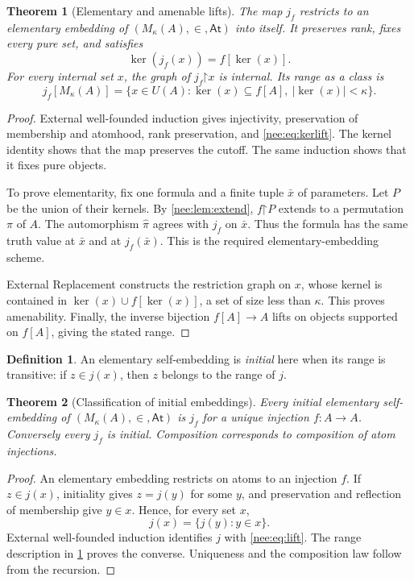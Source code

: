 \documentclass[11pt,letterpaper]{article}
\numberwithin{equation}{section}
\theoremstyle{plain}
\newtheorem{theorem}{Theorem}[section]
\theoremstyle{definition}
\newtheorem{definition}[definition]{Definition}
\theoremstyle{remark}
\newcommand{\At}{\mathsf{At}}
\newcommand{\kerat}{\operatorname{ker}}
\begin{document}
\begin{theorem}[Elementary and amenable lifts]\label{nee:thm:lifts}
The map $j_f$ restricts to an elementary embedding of $(M_\kappa(A),\in,\At)$ into itself. It preserves rank, fixes every pure set, and satisfies
\begin{equation}\label{nee:eq:kerlift}
\kerat(j_f(x))=f[\kerat(x)].
\end{equation}
For every internal set $x$, the graph of $j_f\mathord{\upharpoonright}x$ is internal. Its range as a class is
\[
j_f[M_\kappa(A)]=\{x\in U(A):\kerat(x)\subseteq f[A],\ |\kerat(x)|<\kappa\}.
\]
\end{theorem}
\begin{proof}
External well-founded induction gives injectivity, preservation of membership and atomhood, rank preservation, and \eqref{nee:eq:kerlift}. The kernel identity shows that the map preserves the cutoff. The same induction shows that it fixes pure objects.

To prove elementarity, fix one formula and a finite tuple $\bar x$ of parameters. Let $P$ be the union of their kernels. By \cref{nee:lem:extend}, $f\mathord{\upharpoonright}P$ extends to a permutation $\pi$ of $A$. The automorphism $\widehat\pi$ agrees with $j_f$ on $\bar x$. Thus the formula has the same truth value at $\bar x$ and at $j_f(\bar x)$. This is the required elementary-embedding scheme.

External Replacement constructs the restriction graph on $x$, whose kernel is contained in $\kerat(x)\cup f[\kerat(x)]$, a set of size less than $\kappa$. This proves amenability. Finally, the inverse bijection $f[A]\to A$ lifts on objects supported on $f[A]$, giving the stated range.
\end{proof}

\begin{definition}
An elementary self-embedding is \emph{initial} here when its range is transitive: if $z\in j(x)$, then $z$ belongs to the range of $j$.
\end{definition}

\begin{theorem}[Classification of initial embeddings]\label{nee:thm:initial}
Every initial elementary self-embedding of $(M_\kappa(A),\in,\At)$ is $j_f$ for a unique injection $f:A\to A$. Conversely every $j_f$ is initial. Composition corresponds to composition of atom injections.
\end{theorem}
\begin{proof}
An elementary embedding restricts on atoms to an injection $f$. If $z\in j(x)$, initiality gives $z=j(y)$ for some $y$, and preservation and reflection of membership give $y\in x$. Hence, for every set $x$,
\[
j(x)=\{j(y):y\in x\}.
\]
External well-founded induction identifies $j$ with \eqref{nee:eq:lift}. The range description in \cref{nee:thm:lifts} proves the converse. Uniqueness and the composition law follow from the recursion.
\end{proof}
\end{document}
